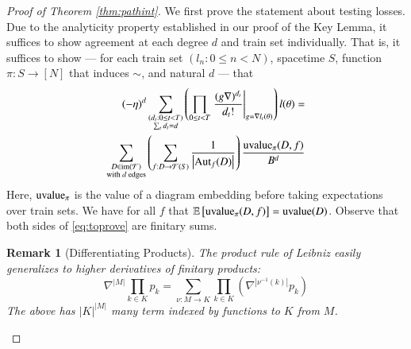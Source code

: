 \documentclass[final,12pt]{colt2021} %
\newtheorem{rmk}{Remark}
\newcommand{\wrap}[1]{\left(#1\right)}
\newcommand{\wabs}[1]{\left|#1\right|}
\newcommand{\Free}{\mathcal{F}}
\newcommand{\Aut}{\text{\textnormal{Aut}}}
\newcommand{\image}{\text{\textnormal{im}}}
\newcommand{\uvalue}{\text{\textnormal{uvalue}}}
\newcommand{\expct}[1]{\mathbb{E}\left[#1\right]}
\begin{document}
        \begin{proof}[Proof of Theorem \ref{thm:pathint}]
            We first prove the statement about testing losses.
            Due to the analyticity property established in our proof of the
            Key Lemma, it suffices to show agreement at each degree $d$ and
            train set individually.  That is, it suffices to show --- for
            each train set $(l_n: 0\leq n<N)$, spacetime $S$, function $\pi:
            S\to [N]$ that induces $\sim$, and natural $d$ --- that
            \begin{align} \label{eq:toprove}
                (-\eta)^d
                \sum_{\substack{
                    (d_t: 0\leq t<T) \\
                    \sum_t d_t = d
                }}
                \wrap{
                    \prod_{0 \leq t < T} \left.
                        \frac{(g \nabla)^{d_t}}{d_t!}
                    \right|_{g=\nabla l_t(\theta)}
                } l (\theta)
                = \nonumber \\
                \sum_{\substack{
                    D \in \image(\Free) \\
                    \textnormal{with $d$ edges}
                }}
                \wrap{
                    \sum_{f: D\to\Free(S)}
                    \frac{1}{\wabs{\Aut_f(D)}}
                }
                \frac{\uvalue_\pi(D, f)}{B^{d}}
            \end{align}
            Here, $\uvalue_\pi$ is the value of a diagram embedding before
            taking expectations over train sets.  We have for all $f$ that
            $\expct{\uvalue_\pi(D, f)} = \uvalue(D)$.
            Observe that both sides of \ref{eq:toprove} are finitary sums.

            \begin{rmk}[Differentiating Products] \label{rmk:leibniz}
                The product rule of Leibniz easily generalizes to higher
                derivatives of finitary products:
                $$
                    \nabla^{\wabs{M}} \prod_{k \in K} p_k
                    = 
                    \sum_{\nu:M\to K} \prod_{k\in K} \wrap{
                        \nabla^{\wabs{\nu^{-1}(k)}} p_k
                    }
                $$
                The above has $\wabs{K}^{\wabs{M}}$ many term indexed by
                functions to $K$ from $M$.
            \end{rmk}


\end{proof}
\end{document}
